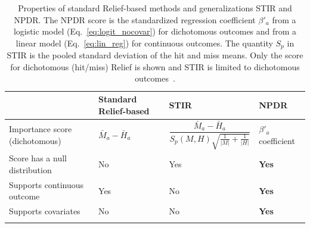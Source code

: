 \documentclass{bioinfo}
\begin{document}
\begin{table}[h]
\centering
\begin{tabular}{p{4.5cm}p{3cm}p{3.5cm}p{2.5cm}}
                           & Standard Relief-based & STIR    & NPDR \\
\hline
Importance score (dichotomous)  & $\bar{M}_a - \bar{H}_a$  & $\dfrac{\bar{M}_a - \bar{H}_a }{S_p(M,H)\sqrt{\frac{1}{|M|}+\frac{1}{|H|}}}$ &  $\beta'_a$ coefficient \\
Score has a null distribution & No                               & Yes     & {\bf Yes}  \\
Supports continuous outcome   & Yes                              & No      & {\bf Yes}  \\
Supports covariates           & No                               & No      & {\bf Yes} \\
\hline\\
\end{tabular}
\caption{Properties of standard Relief-based methods and generalizations STIR and NPDR. The NPDR score is the standardized regression coefficient $\beta'_a$ from a logistic model (Eq.~\ref{eq:logit_nocovar}) for dichotomous outcomes and from a linear model (Eq.~\ref{eq:lin_reg}) for continuous outcomes. The quantity $S_p$ in STIR is the pooled standard deviation of the hit and miss means. Only the score for dichotomous (hit/miss) Relief is shown and STIR is limited to dichotomous outcomes~\cite{stir}.}
\label{tab:compare_npdr}
\end{table}


% 
\end{document}
